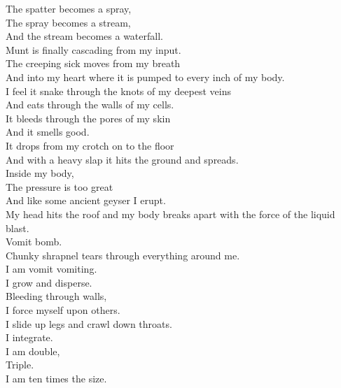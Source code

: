 



The spatter becomes a spray, \\
The spray becomes a stream, \\
And the stream becomes a waterfall. \\
Munt is finally cascading from my input. \\

The creeping sick moves from my breath \\
And into my heart where it is pumped to every inch of my body. \\
I feel it snake through the knots of my deepest veins \\
And eats through the walls of my cells. \\

It bleeds through the pores of my skin \\
And it smells good. \\
It drops from my crotch on to the floor \\
And with a heavy slap it hits the ground and spreads. \\

Inside my body, \\
The pressure is too great \\
And like some ancient geyser I erupt. \\
My head hits the roof and my body breaks apart with the force of the liquid blast. \\

Vomit bomb. \\
Chunky shrapnel tears through everything around me. \\
I am vomit vomiting. \\
I grow and disperse. \\

Bleeding through walls, \\
I force myself upon others. \\
I slide up legs and crawl down throats. \\
I integrate. \\
I am double, \\
Triple. \\
I am ten times the size. \\

